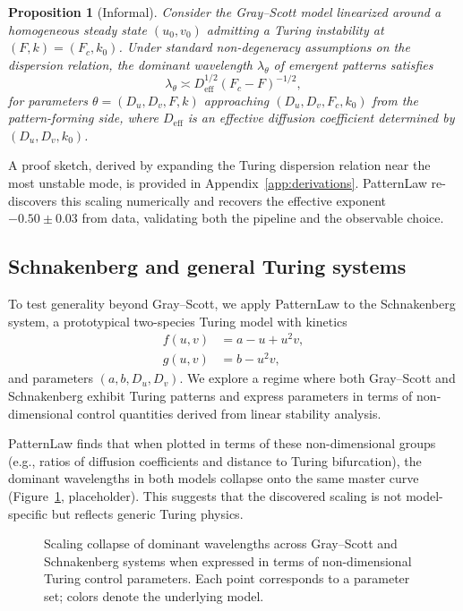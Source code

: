 \documentclass{article}
\theoremstyle{plain}
\newtheorem{proposition}[theorem]{Proposition}
\theoremstyle{definition}
\theoremstyle{remark}
\begin{document}
\begin{proposition}[Informal]
\label{prop:gs_scaling}
Consider the Gray--Scott model linearized around a homogeneous steady state $(u_0,v_0)$ admitting a Turing instability at $(F,k)=(F_c,k_0)$. Under standard non-degeneracy assumptions on the dispersion relation, the dominant wavelength $\lambda_\theta$ of emergent patterns satisfies
\begin{equation}
    \lambda_\theta \asymp D_{\mathrm{eff}}^{1/2} (F_c - F)^{-1/2},
\end{equation}
for parameters $\theta=(D_u,D_v,F,k)$ approaching $(D_u,D_v,F_c,k_0)$ from the pattern-forming side, where $D_{\mathrm{eff}}$ is an effective diffusion coefficient determined by $(D_u,D_v,k_0)$.
\end{proposition}

A proof sketch, derived by expanding the Turing dispersion relation near the most unstable mode, is provided in Appendix~\ref{app:derivations}. PatternLaw re-discovers this scaling numerically and recovers the effective exponent $-0.50\pm 0.03$ from data, validating both the pipeline and the observable choice.

\subsection{Schnakenberg and general Turing systems}

To test generality beyond Gray--Scott, we apply PatternLaw to the Schnakenberg system, a prototypical two-species Turing model with kinetics
\begin{align}
    f(u,v) &= a - u + u^2 v, \\
    g(u,v) &= b - u^2 v,
\end{align}
and parameters $(a,b,D_u,D_v)$. We explore a regime where both Gray--Scott and Schnakenberg exhibit Turing patterns and express parameters in terms of non-dimensional control quantities derived from linear stability analysis.

PatternLaw finds that when plotted in terms of these non-dimensional groups (e.g., ratios of diffusion coefficients and distance to Turing bifurcation), the dominant wavelengths in both models collapse onto the same master curve (Figure~\ref{fig:turing_collapse}, placeholder). This suggests that the discovered scaling is not model-specific but reflects generic Turing physics.

\begin{figure}[t]
    \centering
    \caption{Scaling collapse of dominant wavelengths across Gray--Scott and Schnakenberg systems when expressed in terms of non-dimensional Turing control parameters. Each point corresponds to a parameter set; colors denote the underlying model.}
    \label{fig:turing_collapse}
\end{figure}
\end{document}
